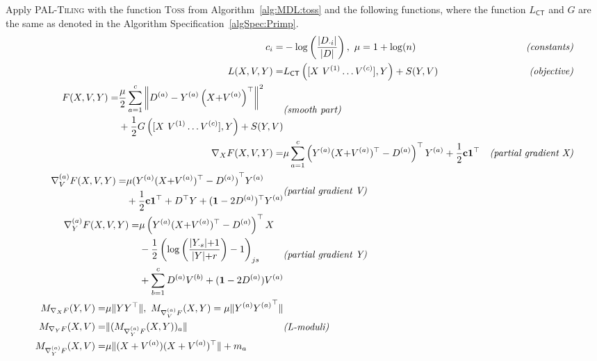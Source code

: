\begin{mybox}
\begin{algSpec}[C-Salt]\label{algSpec:CSalt} Apply \textsc{PAL-Tiling} with the function \textsc{Toss} from Algorithm~\ref{alg:MDL:toss} and the following functions, where the function $L_{\mathsf{CT}}$ and $G$ are the same as denoted in the Algorithm Specification~\ref{algSpec:Primp}.
\begin{align*}
c_i =& -\log\left(\frac{|D_{\cdot i}|}{|D|}\right),\ \mu=1+\log(n) &\textit{(constants)}\\
L(X,V,Y)=& L_{\mathsf{CT}}\left([X\ V^{(1)}\ldots V^{(c)}],Y\right)+S(Y,V)&\textit{(objective)}\\
\begin{split}
F(X,V,Y)=& \frac{\mu}{2}\sum_{a=1}^c\left\|D^{(a)}-Y^{(a)}\left(X{+}V^{(a)}\right)^\top \right\|^2\\
&+\frac{1}{2} G\left([X\ V^{(1)}\ldots V^{(c)}],Y\right)
+S(Y,V)
\end{split}&\textit{(smooth part)}\\
\nabla_XF(X,V,Y)=&\mu\sum_{a=1}^c\left(Y^{(a)}(X{+}V^{(a)})^\top -D^{(a)}\right)^\top Y^{(a)}+\frac{1}{2}\mathbf{c}\mathbf{1}^\top & \textit{(partial gradient X)}\\
\begin{split}
\nabla_V^{(a)} F(X,V,Y)=&\mu{(Y^{(a)}(X{+}V^{(a)})^\top -D^{(a)})}^\top Y^{(a)}\\
&+\frac{1}{2}\mathbf{c1}^\top+D^\top Y +(\mathbf{1}-2D^{(a)})^\top Y^{(a)}
\end{split}&\textit{(partial gradient V)}\\
\begin{split}
\nabla_Y^{(a)} F(X,V,Y)=&\mu \left(Y^{(a)}(X{+}V^{(a)})^\top-D^{(a)}\right)^\top X\\
&-\frac{1}{2}\left(\log\left(\frac{|Y_{\cdot s}|{+}1}{|Y|{+}r}\right)-1\right)_{js}\\
 &+ \sum_{b=1}^cD^{(a)} V^{(b)}+(\mathbf{1}-2D^{(a)})V^{(a)}
  \end{split}& \textit{(partial gradient Y)}\\
  \begin{split}
      M_{\nabla_X F}(Y,V)=&\mu\|YY^\top \|,\ M_{\nabla_V^{(a)} F}(X,Y)=\mu\|Y^{(a)}{Y^{(a)}}^\top \|\\
      M_{\nabla_YF}(X,V)=&\|(M_{\nabla_Y^{(a)} F}(X,Y))_a\|\\ M_{\nabla_Y^{(a)} F}(X,V)=&\mu\|(X+V^{(a)})(X+V^{(a)})^\top \|+m_a
  \end{split} & \textit{(L-moduli)}
\end{align*}
\end{algSpec}
\end{mybox}
